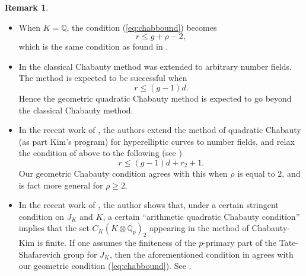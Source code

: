 \documentclass[11pt,oneside]{amsart}
\theoremstyle{plain}
\theoremstyle{definition}
\newtheorem{remark}[theorem]{Remark}
\DeclareMathOperator{\Hom}{Hom}
\def\Q{\mathbb{Q}}
\begin{document}
\begin{remark}
    \begin{itemize}
        \item When $K=\Q$, the condition (\ref{eq:chabbound}) becomes $$r\leq g+\rho-2,$$ which is the same condition as found in \cite{EL19}.
        \item In \cite{siksek} the classical Chabauty method was extended to arbitrary number fields. The method is expected to be successful when $$r\leq (g-1)d.$$ Hence the geometric quadratic Chabauty method is expected to go beyond the classical Chabauty method.
        \item In the recent work  of \cite{BBBM19}, the authors extend the method of quadratic Chabauty (as part Kim's program) for hyperelliptic curves to number fields, and relax the condition of \cite{siksek} above to the following (see \cite[(1.4)]{BBBM19})
        $$ r \le (g-1) d + r_2 + 1. $$
        Our geometric Chabauty condition agrees with this when $\rho$ is equal to $2$, and is fact more general for $\rho \ge 2$. 
        \item In the recent work of \cite{Dogra19}, the author shows that, under a certain stringent condition on $J_K$ and $K$, a certain ``arithmetic quadratic Chabauty condition'' implies that the set $C_K(K\otimes \Q_p)_2$ appearing in the method of Chabauty-Kim is finite. 
 If one assumes the finiteness of the $p$-primary part of the Tate-Shafarevich group for $J_K$, then the aforementioned condition in \cite{Dogra19} agrees with our geometric condition (\ref{eq:chabbound}). See \cite[Proposition 1.1 \& Remark 1.3]{Dogra19}. 
    \end{itemize}

\end{remark}
\end{document}
